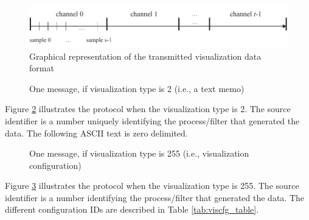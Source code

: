 \documentclass[letterpaper,oneside,12pt]{book}
\begin{document}
\begin{figure}[ht]
 \centerline{\includegraphics{figures/visualization_type1}}
 \caption{Graphical representation of the transmitted visualization data format}
 \label{visualization_type1}
\end{figure}

\begin{figure}[ht]
 \centerline{}
 \caption{One message, if visualization type is 2 (i.e., a text memo)}
 \label{visualizationprotocol_type2}
\end{figure}

Figure \ref{visualizationprotocol_type2} illustrates the protocol when the 
visualization type is 2. The source identifier is a number uniquely 
identifying the process/filter that generated the data. The following ASCII
text is zero delimited.

\begin{figure}[ht]
 \centerline{}
 \caption{One message, if visualization type is 255 (i.e., visualization configuration)}
 \label{visualizationprotocol_type255}
\end{figure}

Figure \ref{visualizationprotocol_type255} illustrates the protocol when the 
visualization type is 255. The source identifier is a number 
identifying the process/filter that generated the data. The different 
configuration IDs are described in Table \ref{tab:viscfg_table}.
\end{document}
